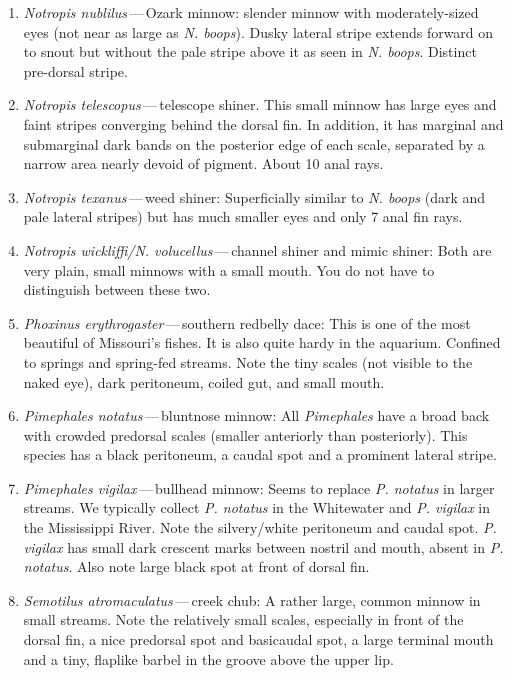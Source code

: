 \documentclass[11pt, hidelinks]{exam}
\begin{document}
\begin{enumerate}
\item \textit{Notropis nublilus}\,—\,Ozark minnow: slender minnow with moderately-sized eyes (not near as large as \textit{N. boops}). Dusky lateral stripe extends forward on to snout but without the pale stripe above it as seen in \textit{N. boops}.  Distinct pre-dorsal stripe.

\item \textit{Notropis telescopus}\,—\,telescope shiner.  This small minnow has large eyes and faint stripes converging behind the dorsal fin.  In addition, it has marginal and submarginal dark bands on the posterior edge of each scale, separated by a narrow area nearly devoid of pigment.  About 10 anal rays. 

\item \textit{Notropis texanus}\,—\,weed shiner: Superficially similar to \textit{N. boops} (dark and pale lateral stripes) but has much smaller eyes and only 7 anal fin rays. 

\item \textit{Notropis wickliffi/N. volucellus}\,—\,channel shiner and mimic shiner: Both are very plain, small minnows with a small mouth.  You do not have to distinguish between these two.

\item \textit{Phoxinus erythrogaster}\,—\,southern redbelly dace:  This is one of the most beautiful of Missouri’s fishes.  It is also quite hardy in the aquarium.  Confined to springs and spring-fed streams.  Note the tiny scales (not visible to the naked eye), dark peritoneum, coiled gut, and small mouth. 

\newpage

\item \textit{Pimephales notatus}\,—\,bluntnose minnow:  All \textit{Pimephales} have a broad back with crowded predorsal scales (smaller anteriorly than posteriorly).  This species has a black peritoneum, a caudal spot and a prominent lateral stripe.

\item \textit{Pimephales vigilax}\,—\,bullhead minnow:  Seems to replace \textit{P. notatus} in larger streams. We typically collect \textit{P. notatus} in the Whitewater and \textit{P. vigilax} in the Mississippi River. Note the silvery/white peritoneum and caudal spot.  \textit{P. vigilax} has small dark crescent marks between nostril and mouth, absent in \textit{P. notatus}. Also note large black spot at front of dorsal fin.

\item \textit{Semotilus atromaculatus}\,—\,creek chub:  A rather large, common minnow in small streams.  Note the relatively small scales, especially in front of the dorsal fin, a nice predorsal spot and basicaudal spot, a large terminal mouth and a tiny, flaplike barbel in the groove above the upper lip.
\end{enumerate}
\end{document}
